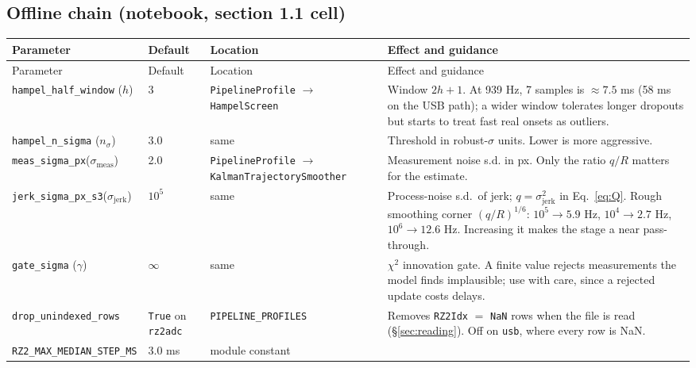 \documentclass[11pt,a4paper]{article}
\newcommand{\code}[1]{\texttt{\small #1}}
\begin{document}
\subsection{Offline chain (notebook, section 1.1 cell)}
\label{sec:params-offline}

\begin{longtable}{@{}P{4.0cm}P{1.65cm}P{3.55cm}P{5.75cm}@{}}
\toprule
Parameter & Default & Location & Effect and guidance \\
\midrule
\endfirsthead
\toprule
Parameter & Default & Location & Effect and guidance \\
\midrule
\endhead
\code{hampel\_half\_window} ($h$) & 3 & \code{PipelineProfile} $\rightarrow$
  \code{HampelScreen} &
  Window $2h+1$. At 939 Hz, 7 samples is $\approx 7.5$ ms (58 ms on the USB
  path); a wider window tolerates longer dropouts but starts to treat fast real
  onsets as outliers. \\
\code{hampel\_n\_sigma} ($n_\sigma$) & 3.0 & same &
  Threshold in robust-$\sigma$ units. Lower is more aggressive. \\
\code{meas\_sigma\_px}\newline($\sigma_{\text{meas}}$) & 2.0 & \code{PipelineProfile}\newline
  $\rightarrow$ \code{Kalman\-Trajectory\-Smoother} &
  Measurement noise s.d. in px. Only the ratio $q/R$ matters for the estimate. \\
\code{jerk\_sigma\_px\_s3}\newline($\sigma_{\text{jerk}}$) & $10^5$ & same &
  Process-noise s.d.\ of jerk; $q = \sigma_{\text{jerk}}^2$ in Eq.~\eqref{eq:Q}.
  Rough smoothing corner $(q/R)^{1/6}$: $10^5 \rightarrow 5.9$ Hz,
  $10^4 \rightarrow 2.7$ Hz, $10^6 \rightarrow 12.6$ Hz. Increasing it makes the
  stage a near pass-through. \\
\code{gate\_sigma} ($\gamma$) & $\infty$ & same &
  $\chi^2$ innovation gate. A finite value rejects measurements the model finds
  implausible; use with care, since a rejected update costs delays. \\
\code{drop\_unindexed\_rows} & \code{True} on \code{rz2adc} &
  \code{PIPELINE\_PROFILES} &
  Removes \code{RZ2Idx} $=$ \code{NaN} rows when the file is read
  (\S\ref{sec:reading}). Off on \code{usb}, where every row is NaN. \\
\code{RZ2\_MAX\_MEDIAN\_\-STEP\_MS} & 3.0 ms & module constant &

\end{longtable}
\end{document}
